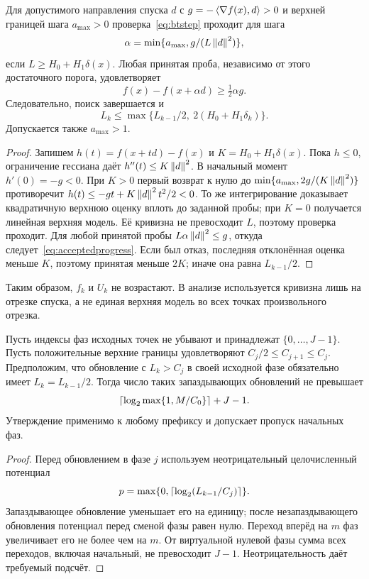 \begin{lemma}\label{lem:local}
Для допустимого направления спуска $d$ с
$g=-\left\langle\nabla f(x),d\right\rangle>0$ и верхней границей шага $a_{\max}>0$
проверка~\eqref{eq:btstep} проходит для шага
\[
\alpha=\min\{a_{\max},g/(L\left\|d\right\|^2)\},
\]
если
$L\ge H_0+H_1\delta(x)$. Любая принятая проба, независимо от этого
достаточного порога, удовлетворяет
\begin{equation}\label{eq:acceptedprogress}
 f(x)-f(x+\alpha d)\ge\tfrac12\alpha g.
\end{equation}
Следовательно, поиск завершается и
\begin{equation}\label{eq:localenvelope}
 L_k\le\max\{L_{k-1}/2,\ 2(H_0+H_1\delta_k)\}.
\end{equation}
Допускается также $a_{\max}>1$.
\end{lemma}
\begin{proof}
Запишем $h(t)=f(x+td)-f(x)$ и $K=H_0+H_1\delta(x)$.
Пока $h\le0$, ограничение гессиана даёт $h''(t)\le K\left\|d\right\|^2$.
В начальный момент $h'(0)=-g<0$. При $K>0$ первый возврат к нулю
до $\min\{a_{\max},2g/(K\left\|d\right\|^2)\}$ противоречит
$h(t)\le-gt+K\left\|d\right\|^2t^2/2<0$. То же интегрирование доказывает
квадратичную верхнюю оценку вплоть до заданной пробы; при $K=0$
получается линейная верхняя модель. Её кривизна не превосходит $L$,
поэтому проверка проходит. Для любой принятой пробы
$L\alpha\left\|d\right\|^2\le g$, откуда следует~\eqref{eq:acceptedprogress}.
Если был отказ, последняя отклонённая оценка меньше $K$, поэтому
принятая меньше $2K$; иначе она равна $L_{k-1}/2$.
\end{proof}

Таким образом, $f_k$ и $U_k$ не возрастают. В анализе используется
кривизна лишь на отрезке спуска, а не единая верхняя модель во всех
точках произвольного отрезка.

\begin{lemma}\label{lem:lag}
Пусть индексы фаз исходных точек не убывают и принадлежат
$\{0,\ldots,J-1\}$. Пусть положительные верхние границы удовлетворяют
$C_j/2\le C_{j+1}\le C_j$. Предположим, что обновление с $L_k>C_j$
в своей исходной фазе обязательно имеет $L_k=L_{k-1}/2$.
Тогда число таких запаздывающих обновлений не превышает
\[
 \left\lceil\log_2\max\{1,M/C_0\}\right\rceil+J-1.
\]
Утверждение применимо к любому префиксу и допускает пропуск начальных фаз.
\end{lemma}
\begin{proof}
Перед обновлением в фазе $j$ используем неотрицательный целочисленный
потенциал
\[
 p=\max\{0,\left\lceil\log_2(L_{k-1}/C_j)\right\rceil\}.
\]
Запаздывающее обновление уменьшает его на единицу; после незапаздывающего
обновления потенциал перед сменой фазы равен нулю. Переход вперёд
на $m$ фаз увеличивает его не более чем на $m$. От виртуальной
нулевой фазы сумма всех переходов, включая начальный, не превосходит
$J-1$. Неотрицательность даёт требуемый подсчёт.
\end{proof}


